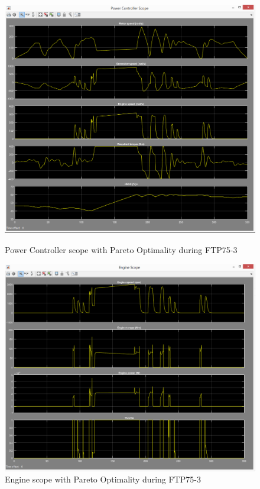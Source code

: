 \begin{figure}[hp]
\centering
\includegraphics[scale=0.4]{figures/Pareto/FTP75-3/powerController08Juni}
\caption{Power Controller scope with Pareto Optimality during FTP75-3}
\label{fig:pcpo3}
\includegraphics[scale=0.42]{figures/Pareto/FTP75-3/engine08Juni}
\caption{Engine scope with Pareto Optimality during FTP75-3}
\label{fig:epo3}
\end{figure}


